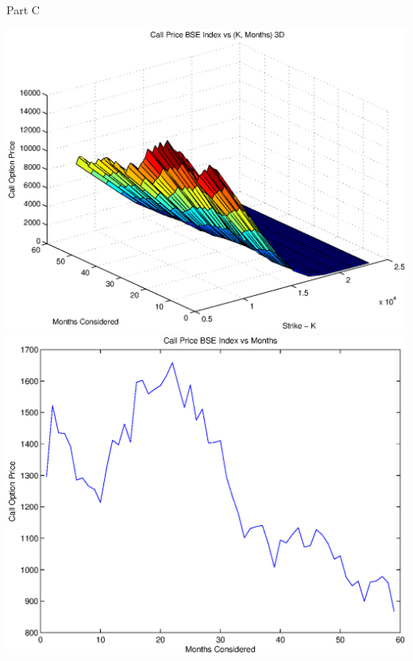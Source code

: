 \documentclass{article}
\begin{document}
\graphicspath{ {plot/}}
\Large  Part C


\includegraphics[width=\textwidth]{Call_Price_BSE_Index_vs_(K,_Months)_3D} \\

\includegraphics[width=\textwidth]{Call_Price_BSE_Index_vs_Months} \\
\end{document}
